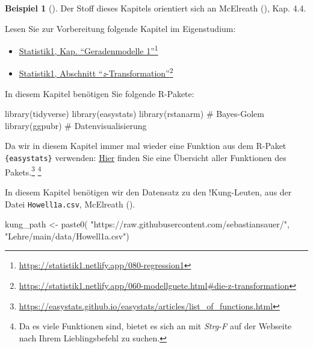 \documentclass[
  ngerman,
  letterpaper,
  twoside,
  open=any]{scrbook}
\newenvironment{Shaded}{\begin{snugshade}}{\end{snugshade}}
\newcommand{\CommentTok}[1]{\textcolor[rgb]{0.37,0.37,0.37}{#1}}
\newcommand{\FunctionTok}[1]{\textcolor[rgb]{0.28,0.35,0.67}{#1}}
\newcommand{\NormalTok}[1]{\textcolor[rgb]{0.00,0.23,0.31}{#1}}
\newcommand{\OtherTok}[1]{\textcolor[rgb]{0.00,0.23,0.31}{#1}}
\newcommand{\StringTok}[1]{\textcolor[rgb]{0.13,0.47,0.30}{#1}}
\providecommand{\tightlist}{%
  \setlength{\itemsep}{0pt}\setlength{\parskip}{0pt}}\usepackage{longtable,booktabs,array}
\theoremstyle{definition}
\newtheorem{example}{Beispiel}[chapter]
\theoremstyle{plain}
\theoremstyle{definition}
\theoremstyle{definition}
\theoremstyle{remark}
\newcommand*\circled[1]{\tikz[baseline=(char.base)]{
          \node[shape=circle,draw,inner sep=1pt] (char) {{\scriptsize#1}};}}
\begin{document}
\begin{example}[]
Der Stoff dieses Kapitels orientiert sich an McElreath
(), Kap. 4.4.

Lesen Sie zur Vorbereitung folgende Kapitel im Eigenstudium:

\begin{itemize}
\tightlist
\item
  \href{https://statistik1.netlify.app/080-regression1}{Statistik1, Kap.
  \enquote{Geradenmodelle 1}}\footnote{\url{https://statistik1.netlify.app/080-regression1}}
\item
  \href{https://statistik1.netlify.app/060-modellguete.html\#die-z-transformation}{Statistik1,
  Abschnitt \enquote{\emph{z}-Transformation}}\footnote{\url{https://statistik1.netlify.app/060-modellguete.html\#die-z-transformation}}
\end{itemize}

In diesem Kapitel benötigen Sie folgende R-Pakete:

\begin{Shaded}
\begin{Highlighting}[]
\FunctionTok{library}\NormalTok{(tidyverse)}
\FunctionTok{library}\NormalTok{(easystats)}
\FunctionTok{library}\NormalTok{(rstanarm)  }\CommentTok{\# Bayes{-}Golem}
\FunctionTok{library}\NormalTok{(ggpubr)  }\CommentTok{\# Datenvisualisierung}
\end{Highlighting}
\end{Shaded}

Da wir in diesem Kapitel immer mal wieder eine Funktion aus dem R-Paket
\texttt{\{easystats\}} verwenden:
\href{https://easystats.github.io/easystats/articles/list_of_functions.html}{Hier}
finden Sie eine Übersicht aller Funktionen des Pakets.\footnote{\url{https://easystats.github.io/easystats/articles/list_of_functions.html}}
\footnote{Da es viele Funktionen sind, bietet es sich an mit
  \emph{Strg-F} auf der Webseite nach Ihrem Lieblingsbefehl zu suchen.}

In diesem Kapitel benötigen wir den Datensatz zu den !Kung-Leuten, aus
der Datei \texttt{Howell1a.csv}, McElreath
().

\protect{}\label{annotated-cell-57}%
\begin{Shaded}
\begin{Highlighting}[]
\NormalTok{kung\_path }\OtherTok{\textless{}{-}} \FunctionTok{paste0}\NormalTok{(}
  \StringTok{"https://raw.githubusercontent.com/sebastiansauer/"}\NormalTok{,}
  \StringTok{"Lehre/main/data/Howell1a.csv"}\NormalTok{) }\hspace*{\fill}\NormalTok{\circled{1}}


\end{Highlighting}
\end{Shaded}
\end{example}
\end{document}
